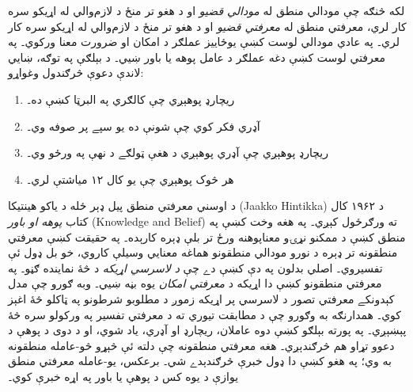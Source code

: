 \documentclass[../../../include/open-logic-section]{subfiles}
\begin{document}


لکه څنګه چې مودالي منطق له \emph{مودالي قضيو} او د هغو تر منځ د لازم‌والي
له اړيکو سره کار لري، معرفتي منطق له \emph{معرفتي قضيو} او د هغو تر منځ
د لازم‌والي له اړيکو سره کار لري۔ په عادي مودالي لوست کښې
يو‌ځاييز عملګر د امکان او ضرورت معنا ورکوي۔ په معرفتي لوست
کښې دغه عملګر د عامل پوهه يا باور ښيي۔ د بېلګې په توګه، ښايي لاندې دعوې څرګندول وغواړو:

\begin{enumerate}
\item ريچارډ پوهېږي چې کالګري په البرټا کښې ده۔
\item آډري فکر کوي چې شونې ده يو سپے پر صوفه وي۔
\item ريچارډ پوهېږي چې آډري پوهېږي د هغې ټولګے د نهې په ورځو وي۔
\item هر څوک پوهېږي چې يو کال ۱۲ مياشتې لري۔
\end{enumerate}
د اوسني معرفتي منطق پيل ډېر ځله د ياکو هينتيکا (Jaakko Hintikka)
د ۱۹۶۲ کال کتاب \emph{پوهه او باور} (Knowledge and Belief) ته ورګرځول
کېږي۔ په هغه وخت کښې په منطق کښې د ممکنو نړۍو معناپوهنه ورځ تر بلې
ډېره کارېده۔ په حقيقت کښې معرفتي منطقونه تر ډېره د نورو مودالي
منطقونو هماغه معنايي وسيلې کاروي، خو بل ډول ئې تفسيروي۔ اصلي بدلون
په دې کښې دے چې \emph{د لاسرسي اړيکه} د څۀ نماينده ګڼو۔ په معرفتي
منطقونو کښې دا اړيکه د \emph{معرفتي امکان} يوه بڼه ښيي۔ وبه ګورو چې
مدل کېدونکے معرفتي تصور د لاسرسي پر اړيکه زموږ د مطلوبو شرطونو په
ټاکلو څۀ اغېز کوي۔ همدارنګه به وګورو چې د مطابقت تيوري ته د معرفتي
تفسير په ورکولو سره څۀ پېښېږي۔ په پورته بېلګو کښې دوه عاملان، ريچارډ
او آډري، ياد شوي، او د دوى د پوهې د دعوو تړاو هم څرګندېږي۔ هغه معرفتي منطقونه چې دلته ئې څېړو څو-عامله منطقونه به وي؛
په هغو کښې دا ډول خبرې څرګندېدے شي۔ برعکس، يو-عامله معرفتي منطق
يوازې د يوه کس د پوهې يا باور په اړه خبرې کوي۔
\end{document}
